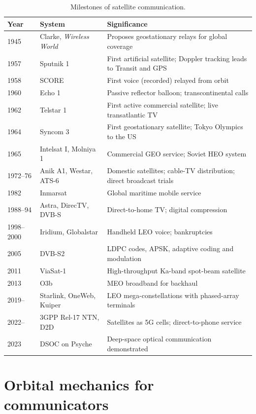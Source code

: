 \begin{table}[htbp]\centering\small
\caption{Milestones of satellite communication.}\label{tab:ch23:milestones}
\begin{tabularx}{\linewidth}{@{}l l X@{}}
\toprule
Year & System & Significance\\
\midrule
1945 & Clarke, \emph{Wireless World} & Proposes geostationary relays for global coverage\\
1957 & Sputnik 1 & First artificial satellite; Doppler tracking leads to Transit and GPS\\
1958 & SCORE & First voice (recorded) relayed from orbit\\
1960 & Echo 1 & Passive reflector balloon; transcontinental calls\\
1962 & Telstar 1 & First active commercial satellite; live transatlantic TV\\
1964 & Syncom 3 & First geostationary satellite; Tokyo Olympics to the US\\
1965 & Intelsat I, Molniya 1 & Commercial GEO service; Soviet HEO system\\
1972--76 & Anik A1, Westar, ATS-6 & Domestic satellites; cable-TV distribution; direct broadcast trials\\
1982 & Inmarsat & Global maritime mobile service\\
1988--94 & Astra, DirecTV, DVB-S & Direct-to-home TV; digital compression\\
1998--2000 & Iridium, Globalstar & Handheld LEO voice; bankruptcies\\
2005 & DVB-S2 & LDPC codes, APSK, adaptive coding and modulation\\
2011 & ViaSat-1 & High-throughput Ka-band spot-beam satellite\\
2013 & O3b & MEO broadband for backhaul\\
2019-- & Starlink, OneWeb, Kuiper & LEO mega-constellations with phased-array terminals\\
2022-- & 3GPP Rel-17 NTN, D2D & Satellites as 5G cells; direct-to-phone service\\
2023 & DSOC on Psyche & Deep-space optical communication demonstrated\\
\bottomrule
\end{tabularx}
\end{table}

\section{Orbital mechanics for communicators}
\label{sec:ch23:orbits}

